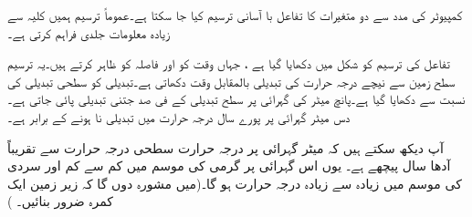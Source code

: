کمپیوٹر کی مدد سے  دو متغیرات کا  تفاعل با آسانی   ترسیم کیا جا سکتا ہے۔عموماً  ترسیم ہمیں   کلیہ سے زیادہ معلومات   جلدی فراہم کرتی ہے۔

تفاعل  کی  ترسیم کو شکل میں دکھایا گیا ہے ، جہاں وقت  کو     اور  فاصلہ کو      ظاہر کرتے ہیں۔یہ ترسیم  سطح زمین سے نیچے درجہ حرارت کی تبدیلی بالمقابل وقت دکھاتی ہے۔تبدیلی کو سطحی تبدیلی کی نسبت سے دکھایا گیا ہے۔پانچ میٹر کی گہرائی پر سطح تبدیلی کے  فی صد جتنی تبدیلی پائی جاتی ہے۔دس میٹر گہرائی پر  پورے سال  درجہ حرارت میں تبدیلی نا ہونے کے برابر ہے۔

آپ دیکھ سکتے ہیں کہ  میٹر گہرائی پر درجہ حرارت سطحی درجہ حرارت سے تقریباً آدھا سال پیچھے    ہے۔ یوں اس گہرائی پر  گرمی کی موسم میں  کم سے کم اور  سردی کی موسم میں  زیادہ سے زیادہ درجہ حرارت ہو گا۔(میں مشورہ  دوں گا کہ زیر زمین ایک کمرہ ضرور بنائیں۔ )

